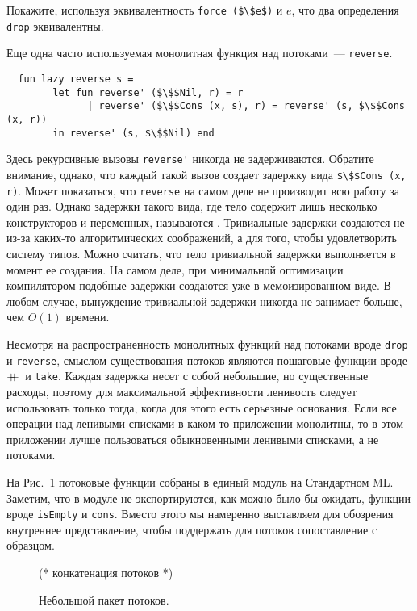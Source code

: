 \begin{exercise}\label{ex:4.1}
  Покажите, используя эквивалентность \lstinline!force ($\$e$)! и $e$,
  что два определения \lstinline!drop! эквивалентны. 
\end{exercise}

Еще одна часто используемая монолитная функция над потоками~---
\lstinline!reverse!.
\begin{lstlisting}
  fun lazy reverse s =
        let fun reverse' ($\$$Nil, r) = r
              | reverse' ($\$$Cons (x, s), r) = reverse' (s, $\$$Cons (x, r))
        in reverse' (s, $\$$Nil) end
\end{lstlisting}
Здесь рекурсивные вызовы \lstinline!reverse'! никогда не
задерживаются. Обратите внимание, однако, что каждый такой вызов
создает задержку вида \lstinline!$\$$Cons (x, r)!. Может показаться,
что \lstinline!reverse! на самом деле не производит всю работу за один
раз. Однако задержки такого вида, где тело содержит лишь
несколько конструкторов и переменных, называются
. Тривиальные задержки создаются не из-за
каких-то алгоритмических соображений, а для того, чтобы удовлетворить
систему типов. Можно считать, что тело тривиальной задержки
выполняется в момент ее создания.  На самом деле, при минимальной
оптимизации компилятором подобные задержки создаются уже в
мемоизированном виде. В любом случае, вынуждение тривиальной
задержки никогда не занимает больше, чем $O(1)$ времени.

Несмотря на распространенность монолитных функций над потоками вроде
\lstinline!drop! и \lstinline!reverse!, смыслом существования потоков
являются пошаговые функции вроде $+\!\!\!+\,$ и \lstinline!take!. Каждая
задержка несет с собой небольшие, но существенные расходы, поэтому для
максимальной эффективности ленивость следует использовать только тогда,
когда для этого есть серьезные основания. Если все операции над
ленивыми списками в каком-то приложении монолитны, то в этом
приложении лучше пользоваться обыкновенными ленивыми списками, а не
потоками.

На Рис.~\ref{fig:4.1} потоковые функции собраны в единый модуль на
Стандартном ML. Заметим, что в модуле не экспортируются, как можно
было бы ожидать,  функции вроде \lstinline!isEmpty! и
\lstinline!cons!. Вместо этого мы намеренно выставляем для обозрения
внутреннее представление, чтобы поддержать для потоков сопоставление с
образцом. 

\begin{figure}
  \centering
  
  (* конкатенация потоков *)
  
  \caption{Небольшой пакет потоков.}
  \label{fig:4.1}
\end{figure}

